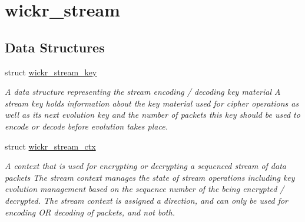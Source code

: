 \hypertarget{group__wickr__stream}{}\section{wickr\+\_\+stream}
\label{group__wickr__stream}
\subsection*{Data Structures}
\begin{DoxyCompactItemize}
\item 
struct \hyperlink{structwickr__stream__key}{wickr\+\_\+stream\+\_\+key}
\begin{DoxyCompactList}\small\item\em A data structure representing the stream encoding / decoding key material A stream key holds information about the key material used for cipher operations as well as it\textquotesingle{}s next evolution key and the number of packets this key should be used to encode or decode before evolution takes place. \end{DoxyCompactList}\item 
struct \hyperlink{structwickr__stream__ctx}{wickr\+\_\+stream\+\_\+ctx}
\begin{DoxyCompactList}\small\item\em A context that is used for encrypting or decrypting a sequenced stream of data packets The stream context manages the state of stream operations including key evolution management based on the sequence number of the being encrypted / decrypted. The stream context is assigned a direction, and can only be used for encoding OR decoding of packets, and not both. \end{DoxyCompactList}\end{DoxyCompactItemize}
